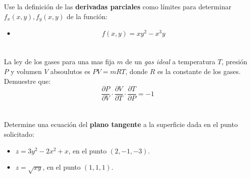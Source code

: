 \documentclass[12pt]{article}
\begin{document}
\section{}

Use la definición de las \textbf{derivadas parciales} como límites para determinar $f_x(x, y), f_y(x, y)$ de la función:

\begin{itemize}[format=\textbf]

\item $$f(x, y) = xy^2 − x^3y$$

\end{itemize}

\section{}

La ley de los gases para una mas fija $m$ de un \textit{gas ideal} a temperatura $T$, presión $P$ y volumen $V$ absoulutos es $P V = mRT$, donde $R$ es la constante de los gases. Demuestre que:
$$\frac{∂P}{∂V} \cdot \frac{∂V}{∂T} \cdot \frac{∂T}{∂P} = −1$$

\section{}

Determine una ecuación del \textbf{plano tangente} a la superficie dada en el punto solicitado:

\begin{itemize}[format=\textbf]

\item $z=3y^2-2x^2+x$, en el punto $(2,-1,-3)$.

\item $z=\sqrt{xy}$, en el punto $(1,1,1)$.

\end{itemize}

\section{}
\end{document}
